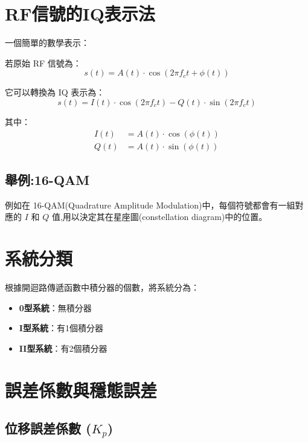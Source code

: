 \documentclass{article}
\begin{document}

\section*{RF信號的IQ表示法}

一個簡單的數學表示：

若原始 RF 信號為：
\[
s(t) = A(t) \cdot \cos\left(2\pi f_c t + \phi(t)\right)
\]

它可以轉換為 IQ 表示為：
\[
s(t) = I(t) \cdot \cos\left(2\pi f_c t\right) - Q(t) \cdot \sin\left(2\pi f_c t\right)
\]

其中：
\[
\begin{aligned}
I(t) &= A(t) \cdot \cos\left(\phi(t)\right) \\
Q(t) &= A(t) \cdot \sin\left(\phi(t)\right)
\end{aligned}
\]

\subsection*{舉例:16-QAM}

例如在 16-QAM(Quadrature Amplitude Modulation)中，每個符號都會有一組對應的 $I$ 和 $Q$ 值,用以決定其在星座圖(constellation diagram)中的位置。

\section{系統分類}

根據開迴路傳遞函數中積分器的個數，將系統分為：

\begin{itemize}
    \item \textbf{0型系統}：無積分器
    \item \textbf{I型系統}：有1個積分器
    \item \textbf{II型系統}：有2個積分器
\end{itemize}

\section{誤差係數與穩態誤差}

\subsection{位移誤差係數 ($K_p$)}
\end{document}
